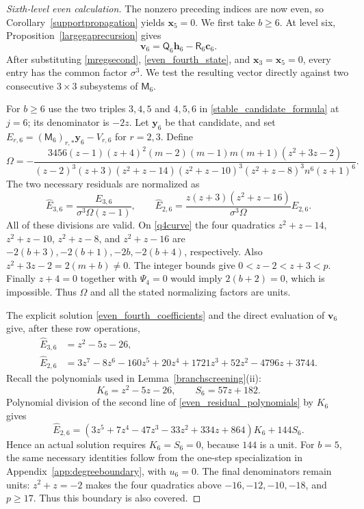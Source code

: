 \documentclass[10pt,a4paper]{amsart}
\begin{document}
\begin{proof}[Sixth-level even calculation]
The nonzero preceding indices are now even, so
Corollary~\ref{supportpropagation} yields $\mathbf x_5=0$.
We first take $b\ge6$.  At level six,
Proposition~\ref{largegaprecursion} gives
\[
 \mathbf v_6=\mathsf Q_6\mathbf h_6-\mathsf R_6\mathbf c_6.
\]
After substituting \eqref{mregsecond}, \eqref{even_fourth_state}, and
$\mathbf x_3=\mathbf x_5=0$, every entry has the common factor
$\sigma^3$.  We test the resulting vector directly against two
consecutive $3\times3$ subsystems of $\mathsf M_6$.

For $b\ge6$ use the two triples $3,4,5$ and $4,5,6$ in
\eqref{stable_candidate_formula} at $j=6$; its denominator is $-2z$.
Let $\mathbf y_6$ be that candidate, and set
$E_{r,6}=(\mathsf M_6)_{r,*}\mathbf y_6-V_{r,6}$ for $r=2,3$.
Define
\begin{equation*}
 \Omega=-\frac{3456(z-1)(z+4)^2(m-2)(m-1)m(m+1)(z^2+3z-2)}
 {(z-2)^3(z+3)(z^2+z-14)(z^2+z-10)^3
                    (z^2+z-8)^3n^6(z+1)^6}.
\end{equation*}
The two necessary residuals are normalized as
\[
 \widehat E_{3,6}=\frac{E_{3,6}}{\sigma^3\Omega(z-1)},\qquad
 \widehat E_{2,6}=\frac{z(z+3)(z^2+z-16)}{\sigma^3\Omega}E_{2,6}.
\]
All of these divisions are valid.  On \eqref{q4curve} the four
quadratics $z^2+z-14$, $z^2+z-10$, $z^2+z-8$, and $z^2+z-16$
are $-2(b+3),-2(b+1),-2b,-2(b+4)$, respectively.
Also $z^2+3z-2=2(m+b)\ne0$.
The integer bounds give $0<z-2<z+3<p$.  Finally $z+4=0$ together
with $\Psi_4=0$ would imply $2(b+2)=0$, which is impossible.
Thus $\Omega$ and all the stated normalizing factors are units.

The explicit solution \eqref{even_fourth_coefficients} and the direct
evaluation of $\mathbf v_6$ give, after these row operations,
\begin{equation}\label{even_residual_polynomials}
\begin{aligned}
 \widehat E_{3,6}&=z^2-5z-26,\\
 \widehat E_{2,6}&=3z^7-8z^6-160z^5+20z^4+1721z^3
                           +52z^2-4796z+3744.
\end{aligned}
\end{equation}
Recall the polynomials used in Lemma~\ref{branchscreening}(ii):
\begin{equation}\label{vsixthres}
 K_6=z^2-5z-26,\qquad S_6=57z+182.
\end{equation}
Polynomial division of the second line of
\eqref{even_residual_polynomials} by $K_6$ gives
\[
 \widehat E_{2,6}=(3z^5+7z^4-47z^3-33z^2+334z+864)K_6+144S_6.
\]
Hence an actual solution requires $K_6=S_6=0$, because $144$ is a unit.
For $b=5$, the same necessary identities follow from the one-step
specialization in Appendix~\ref{app:degreeboundary}, with $u_6=0$.  The final denominators
remain units: $z^2+z=-2$ makes the four quadratics above
$-16,-12,-10,-18$, and $p\ge17$.  Thus this boundary is also covered.


\end{proof}
\end{document}
